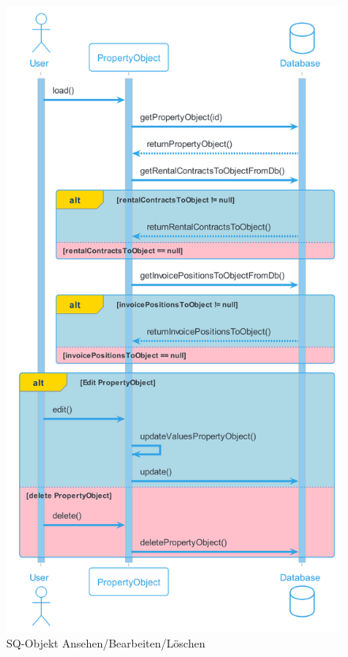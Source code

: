 \begin{figure}[H]
  \begin{center}
    \includegraphics[width=0.7\linewidth]{content/diagrams/out/sequenzdiagram/objektAnsehenBearbeiten/objektAnsehenBearbeiten.png}
    \caption{SQ-Objekt Ansehen/Bearbeiten/Löschen}
    \label{sqObjektEdit}
  \end{center}
\end{figure}

